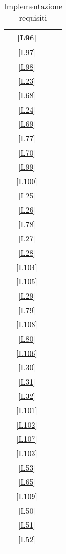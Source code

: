 \begin{longtable}{|c|c|}
	\hline \ref{L96} & \si \\
	\hline \ref{L97} & \si \\ %
	\hline \ref{L98} & \si \\
	\hline \ref{L23} & \si \\
	\hline \ref{L68} & \si \\
	\hline \ref{L24} & \si \\
	\hline \ref{L69} & \si \\ %
	\hline \ref{L77} & \si \\
	\hline \ref{L70} & \no \\
	\hline \ref{L99} & \si \\
	\hline \ref{L100} & \no \\
	\hline \ref{L25} & \si \\ %
	\hline \ref{L26} & \si \\
	\hline \ref{L78} & \si \\
	\hline \ref{L27} & \no \\
	\hline \ref{L28} & \no \\
	\hline \ref{L104} & \si \\ %
	\hline \ref{L105} & \si \\
	\hline \ref{L29} & \si \\
	\hline \ref{L79} & \si \\
	\hline \ref{L108} & \si \\
	\hline \ref{L80} & \si \\ %
	\hline \ref{L106} & \si \\
	\hline \ref{L30} & \si \\
	\hline \ref{L31} & \si \\
	\hline \ref{L32} & \si \\  
	\hline \ref{L101} & \si \\%
	\hline \ref{L102} & \si \\ 
	\hline \ref{L107} & \si \\
	\hline \ref{L103} & \no \\
	\hline \ref{L53} & \no \\ 
	\hline \ref{L65} & \no \\ %
	\hline \ref{L109} & \no \\
	\hline \ref{L50} & \no \\
	\hline \ref{L51} & \no \\
	\hline \ref{L52} & \no \\ %
	\hline
	\caption{Implementazione requisiti}
\end{longtable}